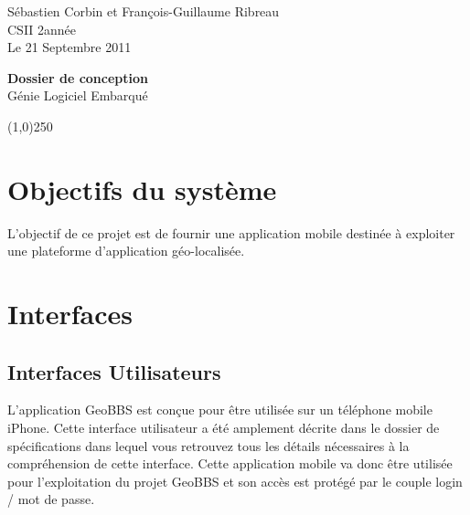 \documentclass[a4paper,12pt]{report}
\begin{document}
  \begin{onehalfspace}

    \begin{titlepage}
      \begin{center}
        Sébastien Corbin et François-Guillaume Ribreau\\
        CSII 2\ieme année\\
        Le 21 Septembre 2011\\
      \end{center}
      \hrulefill
      \vspace{7cm}
      \begin{center}
        \LARGE \textbf{Dossier de conception}\\
        \vspace{3cm}
        \normalsize Génie Logiciel Embarqué
      \end{center}

      \vspace{9,5cm}

      \begin{center}
      \line(1,0){250}
      \end{center}

      \begin{center}
      \tiny{\currfilename}
      \end{center}


    \end{titlepage}
    \clearpage

  \thispagestyle{empty}
  \setcounter{page}{0}
  \clearpage

\chapter{Objectifs du système}
L'objectif de ce projet est de fournir une application mobile destinée à exploiter une plateforme d'application géo-localisée.

\chapter{Interfaces}
\section{Interfaces Utilisateurs}
L'application GeoBBS est conçue pour être utilisée sur un téléphone mobile iPhone.
Cette interface utilisateur a été amplement décrite dans le dossier de spécifications dans lequel vous retrouvez tous les détails nécessaires à la compréhension de cette interface.
Cette application mobile va donc être utilisée pour l'exploitation du projet GeoBBS et son accès est protégé par le couple login / mot de passe.


\end{onehalfspace}
\end{document}

